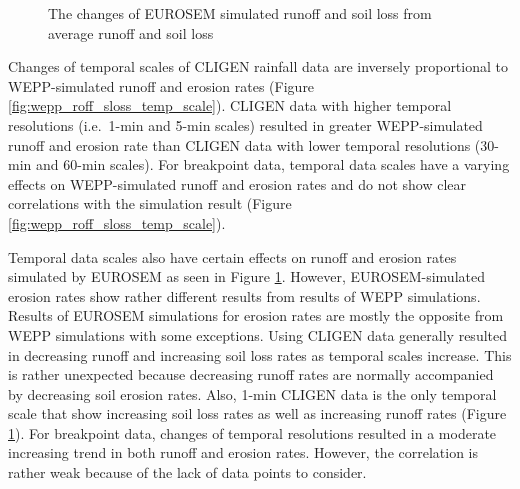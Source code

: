 \begin{figure}[p]
  \centering
  \caption{The changes of EUROSEM simulated runoff and soil loss from average
runoff and soil loss}
  \label{fig:eurosem_roff_sloss_temp_scale}
\end{figure}

Changes of temporal scales of CLIGEN rainfall data are inversely proportional
to WEPP-simulated runoff and erosion rates (Figure
\ref{fig:wepp_roff_sloss_temp_scale}). CLIGEN data with higher temporal
resolutions (i.e.\ 1-min and 5-min scales) resulted in greater WEPP-simulated
runoff and erosion rate than CLIGEN data with lower temporal resolutions (30-min
and 60-min scales). For breakpoint data, temporal data scales have a varying
effects on WEPP-simulated runoff and erosion rates and do not show clear
correlations with the simulation result (Figure
\ref{fig:wepp_roff_sloss_temp_scale}).

Temporal data scales also have certain effects on runoff and erosion rates
simulated by EUROSEM as seen in Figure \ref{fig:eurosem_roff_sloss_temp_scale}.
However, EUROSEM-simulated erosion rates show rather different results from
results of WEPP simulations. Results of EUROSEM simulations for erosion rates
are mostly the opposite from WEPP simulations with some exceptions. Using CLIGEN
data generally resulted in decreasing runoff and increasing soil loss rates as
temporal scales increase. This is rather unexpected because decreasing runoff
rates are normally accompanied by decreasing soil erosion rates. Also, 1-min
CLIGEN data is the only temporal scale that show increasing soil loss rates as
well as increasing runoff rates (Figure
\ref{fig:eurosem_roff_sloss_temp_scale}). For breakpoint data, changes of
temporal resolutions resulted in a moderate increasing trend in both runoff and
erosion rates. However, the correlation is rather weak because of the lack of
data points to consider.

